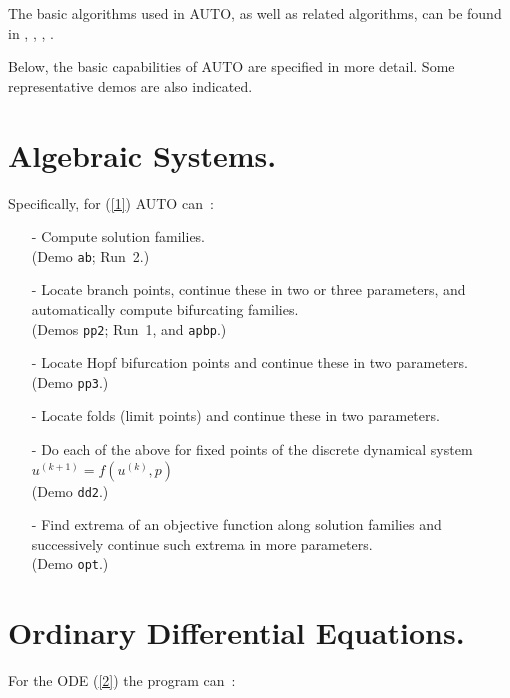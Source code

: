 \documentclass[12pt]{report}
\begin{document}
The basic algorithms used in {\cal AUTO},
as well as related algorithms, can be found in 
 \citeyear{HBK:77},
 \citeyear{HBK:86},
 \citeyear{DoKeKe:91a},
 \citeyear{DoKeKe:91b}.

Below, the basic capabilities of {\cal AUTO} are specified in more detail.
Some representative demos are also indicated.
 
\section{ Algebraic Systems.} \label{sec:algebraic_systems}
Specifically, for (\ref{1}) {\cal AUTO} can~:~
 
\begin{itemize}
\item[-]
  Compute solution families.\\  (Demo {\tt ab}; Run~2.) 
\item[-]
  Locate branch points, continue these in two or three parameters,
  and automatically compute
  bifurcating families. \\ (Demos {\tt pp2}; Run~1, and {\tt apbp}.)
\item[-]
  Locate Hopf bifurcation points and continue these in two
  parameters. \\ (Demo {\tt pp3}.)
\item[-]
  Locate folds (limit points) and continue these 
  in two parameters. \\
\item[-]
  Do each of the above for fixed points
  of the discrete dynamical system 
  $u^{(k+1)}= f( u^{(k)}, p )$ \\ (Demo {\tt dd2}.)
\item[-]
  Find extrema of an objective function along solution families
  and successively continue such extrema in more parameters.
  \\ (Demo {\tt opt}.)
\end{itemize}


\section{ Ordinary Differential Equations.} \label{sec:ODEs}
For the ODE (\ref{2}) the program can~:~
 
\end{document}
